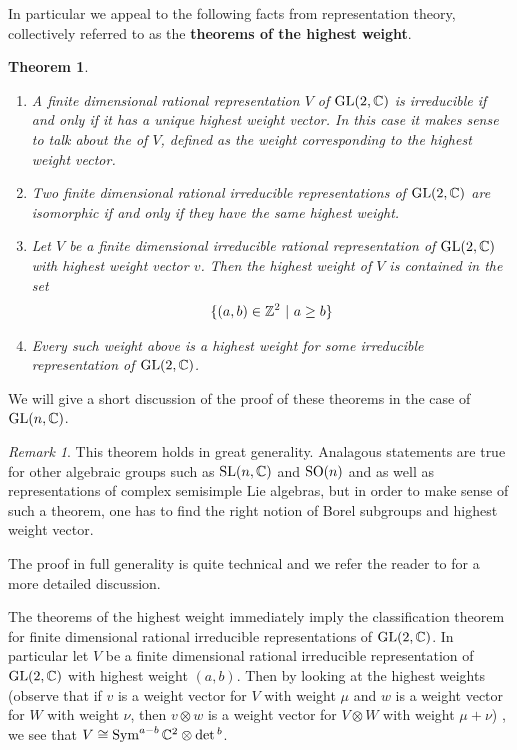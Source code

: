 \documentclass{amsart}
\numberwithin{equation}{section}
\theoremstyle{plain} %
\newtheorem{theorem}[equation]{Theorem}
\theoremstyle{definition}
\theoremstyle{remark}
\newtheorem{remark}[equation]{Remark}
\begin{document}
\hfill

In particular we appeal to the following facts from representation theory,
collectively referred to as the \textbf{theorems of the highest weight}.
\begin{theorem}\label{thm:hw}
	\hfill
	\begin{enumerate}
		\item A finite dimensional rational representation $V$ of $\operatorname{GL}(2,\mathbb{C})$ is irreducible if and only if it has a unique highest weight vector.
		      In this case it makes sense to talk about the  of $V$, defined as the weight corresponding to the highest weight vector.
		\item Two finite dimensional rational irreducible representations of $\operatorname{GL}(2,\mathbb{C})$ are isomorphic if and only if they have the same highest weight.
		\item Let $V$ be a finite dimensional irreducible rational representation of $\operatorname{GL}(2,\mathbb{C})$ with highest weight vector $v$. Then the highest weight of $V$ is contained in the set \begin{align*}
			      \{(a,b)\in \mathbb{Z}^2 \ \vert \  a\geq b \}
		      \end{align*}
		\item Every such weight above is a highest weight for some irreducible representation of $\operatorname{GL}(2,\mathbb{C})$.
	\end{enumerate}
\end{theorem}

We will give a short discussion of the proof of these theorems in the case of $\operatorname{GL}(n,\mathbb{C})$.

\begin{remark}
	This theorem holds in great generality. Analagous 
    statements are true for other algebraic groups such as $\operatorname{SL}(n,\mathbb{C})$ and $\operatorname{SO}(n)$
	and as well as representations of complex semisimple Lie algebras,
	but in order to make sense of such a theorem, one has to find the right notion of Borel subgroups and
	highest weight vector.
\end{remark}

The proof in full generality is quite technical and we refer the reader to \cite{milne} for a more detailed discussion.

\hfill

The theorems of the highest weight immediately imply the classification theorem for finite dimensional rational irreducible representations of $\operatorname{GL}(2,\mathbb{C})$.
In particular let $V$ be a finite dimensional rational irreducible representation of $\operatorname{GL}(2,\mathbb{C})$ with highest weight $(a,b)$. Then
by looking at the highest weights (observe that if $v$ is a weight vector for $V$ with weight $\mu$ and
$w$ is a weight vector for $W$ with weight $\nu$, then $v\otimes w$ is a weight vector for $V\otimes W$ with weight $\mu + \nu$)
, we see that $V \cong \operatorname{Sym}^{a-b}\mathbb{C}^2 \otimes \det{}^{b}$.
\end{document}
